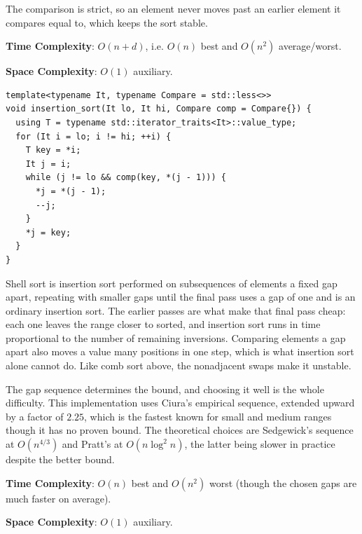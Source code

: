 The comparison  is strict, so an element never moves past an earlier element it compares equal to, which keeps the sort stable.

\textbf{Time Complexity}: $O(n + d)$, i.e. $O(n)$ best and $O(n^{2})$ average/worst.

\textbf{Space Complexity}: $O(1)$ auxiliary.

\begin{lstlisting}[style=cpp]
template<typename It, typename Compare = std::less<>>
void insertion_sort(It lo, It hi, Compare comp = Compare{}) {
  using T = typename std::iterator_traits<It>::value_type;
  for (It i = lo; i != hi; ++i) {
    T key = *i;
    It j = i;
    while (j != lo && comp(key, *(j - 1))) {
      *j = *(j - 1);
      --j;
    }
    *j = key;
  }
}
\end{lstlisting}
Shell sort is insertion sort performed on subsequences of elements a fixed gap apart, repeating with smaller gaps until the final pass uses a gap of one and is an ordinary insertion sort. The earlier passes are what make that final pass cheap: each one leaves the range closer to sorted, and insertion sort runs in time proportional to the number of remaining inversions. Comparing elements a gap apart also moves a value many positions in one step, which is what insertion sort alone cannot do. Like comb sort above, the nonadjacent swaps make it unstable.

The gap sequence determines the bound, and choosing it well is the whole difficulty. This implementation uses Ciura's empirical sequence, extended upward by a factor of $2.25$, which is the fastest known for small and medium ranges though it has no proven bound. The theoretical choices are Sedgewick's sequence at $O(n^{4/3})$ and Pratt's at $O(n \log^{2} n)$, the latter being slower in practice despite the better bound.

\textbf{Time Complexity}: $O(n)$ best and $O(n^{2})$ worst (though the chosen gaps are much faster on average).

\textbf{Space Complexity}: $O(1)$ auxiliary.

